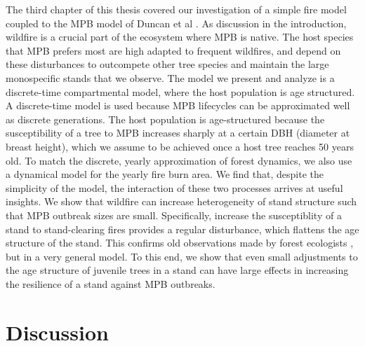 The third chapter of this thesis covered our investigation of a simple fire model coupled to the MPB model of Duncan et al \cite{duncan2015model}. As discussion in the introduction, wildfire is a crucial part of the ecosystem where MPB is native. The host species that MPB prefers most are high adapted to frequent wildfires, and depend on these disturbances to outcompete other tree species and maintain the large monospecific stands that we observe. The model we present and analyze is a discrete-time compartmental model, where the host population is age structured. A discrete-time model is used because MPB lifecycles can be approximated well as discrete generations. The host population is age-structured because the susceptibility of a tree to MPB increases sharply at a certain DBH (diameter at breast height), which we assume to be achieved once a host tree reaches 50 years old. To match the discrete, yearly approximation of forest dynamics, we also use a dynamical model for the yearly fire burn area. We find that, despite the simplicity of the model, the interaction of these two processes arrives at useful insights. We show that wildfire can increase heterogeneity of stand structure such that MPB outbreak sizes are small. Specifically, increase the susceptiblity of a stand to stand-clearing fires provides a regular disturbance, which flattens the age structure of the stand. This confirms old observations made by forest ecologists \cite{kaufmann2008status, seidl2016spatial}, but in a very general model. To this end, we show that even small adjustments to the age structure of juvenile trees in a stand can have large effects in increasing the resilience of a stand against MPB outbreaks.     


\section{Discussion}

